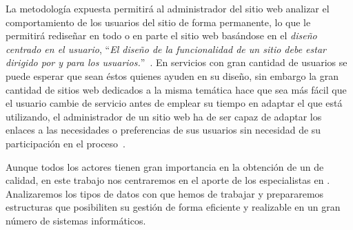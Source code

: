 La metodología expuesta permitirá al administrador del sitio web analizar el comportamiento de los usuarios del sitio de forma permanente, lo que le permitirá rediseñar en todo o en parte el sitio web basándose en el \emph{diseño centrado en el usuario}, "`\emph{El diseño de la funcionalidad de un sitio debe estar dirigido por y para los usuarios.}"'~\citep{BaezaYatesRivera-UbicuidadYUsabilidadEnLaWeb-2003}. En servicios con gran cantidad de usuarios se puede esperar que sean éstos quienes ayuden en su diseño, sin embargo la gran cantidad de sitios web dedicados a la misma temática hace que sea más fácil que el usuario cambie de servicio antes de emplear su tiempo en adaptar el que está utilizando, el administrador de un sitio web ha de ser capaz de adaptar los enlaces a las necesidades o preferencias de sus usuarios sin necesidad de su participación en el proceso~\citep{FinkKobsaNill-UserOrientedAdaptivity-1996,JoachimsFreitagMitchell-WebWatcherATourGuideForTheWorldWideWeb-1997,FerreJuristoWindlConstantine-UsabilityBasicsForSoftwareDevelopment-2001}.

Aunque todos los actores tienen gran importancia en la obtención de un \SRW de calidad, en este trabajo nos centraremos en el aporte de los especialistas en \dm. Analizaremos los tipos de datos con que hemos de trabajar y prepararemos estructuras que posibiliten su gestión de forma eficiente y realizable en un gran número de sistemas informáticos.%